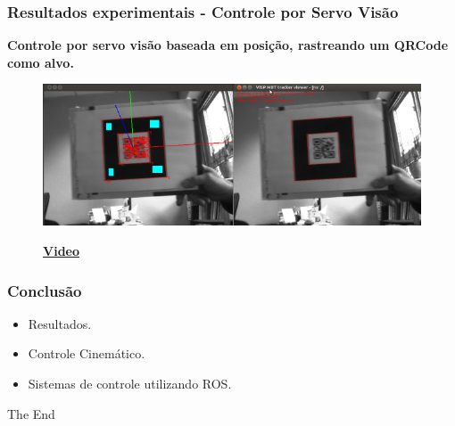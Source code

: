 \documentclass{beamer}
\begin{document}
\begin{frame}
\frametitle{Resultados experimentais - Controle por Servo Visão}
\textbf{Controle por servo visão baseada em posição, rastreando um QRCode como alvo.}
\begin{figure}[H]
\includegraphics[width=0.8\linewidth]{./img/tracker_viewer-small.png}
\begin{center}
\href{run:./videos/vision_complete.mp4}{\textbf{Video}}%
\end{center}
\end{figure}%
\end{frame}

\begin{frame}
\frametitle{Conclusão}
\begin{itemize}
\item Resultados.
\item Controle Cinemático.
\item Sistemas de controle utilizando ROS.
\end{itemize}
\end{frame}


\begin{frame}
\Huge{\centerline{The End}}
\end{frame}

\end{document}
